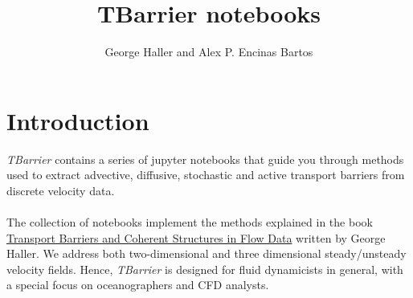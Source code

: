\documentclass{article}
\begin{document}
\title{TBarrier notebooks}

\author{George Haller and Alex P. Encinas Bartos}

\maketitle

\tableofcontents

\section{Introduction}
\textit{TBarrier} contains a series of jupyter notebooks that guide you  through methods used to extract advective, diffusive, stochastic and active  transport barriers from discrete velocity data. \\ \\
The collection of notebooks implement the methods explained in the book \href{https://github.com/EncinasBartos/TBarrier}{Transport Barriers and Coherent Structures in Flow Data} written by George Haller. We address both two-dimensional and three dimensional steady/unsteady velocity fields. Hence, \textit{TBarrier} is designed for fluid dynamicists in general, with a special focus on oceanographers and CFD analysts.
\end{document}
